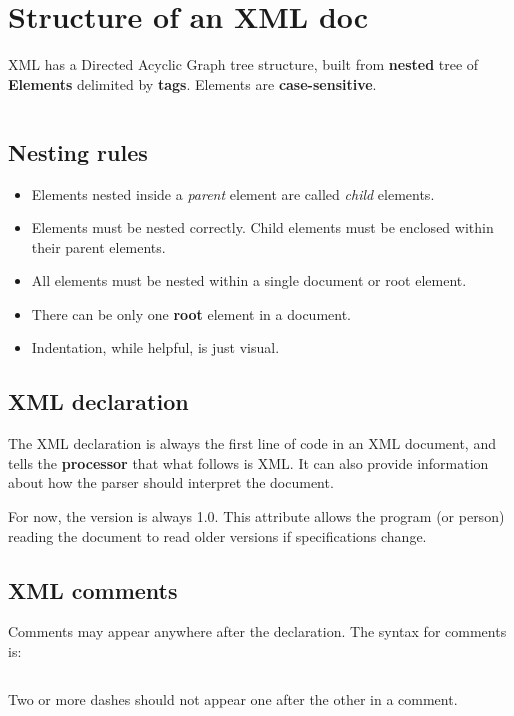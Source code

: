\documentclass[slides]{pgnotes}
\begin{document}
\section{Structure of an XML doc}

XML has a Directed Acyclic Graph tree structure, built from \textbf{nested} tree of \textbf{Elements} delimited by \textbf{tags}.
Elements are \textbf{case-sensitive}.

\inputminted{xml}{closed.xml}

\subsection{Nesting rules} 

\begin{itemize}
\item Elements nested inside a \textit{parent} element are called \textit{child} elements. 
\item Elements must be nested correctly. Child elements must be enclosed within their parent elements.
\item All elements must be nested within a single document or root element.
\item There can be only one \textbf{root} element in a document.
\item Indentation, while helpful, is just visual.  
\end{itemize}


\subsection{XML declaration}

The XML declaration is always the first line of code in an XML document, and tells the \textbf{processor} that what follows is XML.
It can also provide information about how the parser should interpret the document.

For now, the version is always 1.0.
This attribute allows the program (or person) reading the document to read older versions if specifications change. 


\subsection{XML comments}

Comments may appear anywhere after the declaration.
The syntax for comments is:

\inputminted{xml}{comment.xml}

Two or more dashes should not appear one after the other in a comment.
\end{document}
